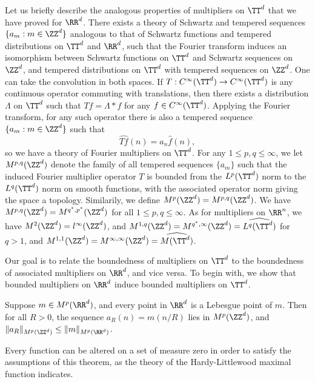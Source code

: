 Let us briefly describe the analogous properties of multipliers on $\TT^d$ that we have proved for $\RR^d$. There exists a theory of Schwartz and tempered sequences $\{ a_m : m \in \ZZ^d \}$ analogous to that of Schwartz functions and tempered distributions on $\TT^d$ and $\RR^d$, such that the Fourier transform induces an isomorphism between Schwartz functions on $\TT^d$ and Schwartz sequences on $\ZZ^d$, and tempered distributions on $\TT^d$ with tempered sequences on $\ZZ^d$. One can take the convolution in both spaces. If $T: C^\infty(\TT^d) \to C^\infty(\TT^d)$ is any continuous operator commuting with translations, then there exists a distribution $\Lambda$ on $\TT^d$ such that $Tf = \Lambda * f$ for any $f \in C^\infty(\TT^d)$. Applying the Fourier transform, for any such operator there is also a tempered sequence $\{ a_m : m \in \ZZ^d \}$ such that
%
\[ \widehat{Tf}(n) = a_n \widehat{f}(n), \]
%
so we have a theory of Fourier multipliers on $\TT^d$. For any $1 \leq p,q \leq \infty$, we let $M^{p,q}(\ZZ^d)$ denote the family of all tempered sequences $\{ a_m \}$ such that the induced Fourier multiplier operator $T$ is bounded from the $L^p(\TT^d)$ norm to the $L^q(\TT^d)$ norm on smooth functions, with the associated operator norm giving the space a topology. Similarily, we define $M^p(\ZZ^d) = M^{p,q}(\ZZ^d)$. We have $M^{p,q}(\ZZ^d) = M^{q^*,p^*}(\ZZ^d)$ for all $1 \leq p,q \leq \infty$. As for multipliers on $\RR^n$, we have $M^2(\ZZ^d) = l^\infty(\ZZ^d)$, and $M^{1,q}(\ZZ^d) = M^{q^*,\infty}(\ZZ^d) = \widehat{L^q(\TT^d)}$ for $q > 1$, and $M^{1,1}(\ZZ^d) = M^{\infty,\infty}(\ZZ^d) = \widehat{M(\TT^d)}$.

Our goal is to relate the boundedness of multipliers on $\TT^d$ to the boundedness of associated multipliers on $\RR^d$, and vice versa. To begin with, we show that bounded multipliers on $\RR^d$ induce bounded multipliers on $\TT^d$.

\begin{theorem}
    Suppose $m \in M^p(\RR^d)$, and every point in $\RR^d$ is a Lebesgue point of $m$. Then for all $R > 0$, the sequence $a_R(n) = m(n/R)$ lies in $M^p(\ZZ^d)$, and $\| a_R \|_{M^p(\ZZ^d)} \leq \| m \|_{M^p(\RR^d)}$.
\end{theorem}

\begin{remark}
    Every function can be altered on a set of measure zero in order to satisfy the assumptions of this theorem, as the theory of the Hardy-Littlewood maximal function indicates.
\end{remark}

